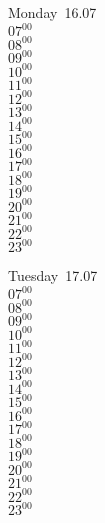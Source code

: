 \documentclass[11pt, a4paper]{book}\usepackage[]{graphicx}\usepackage[]{color}
\begin{document}
\begin{headerbox}
\end{headerbox}
\begin{weekdaybox}
  Monday~16.07\\
  { 
  \vfill
  $07^{00}$\\
$08^{00}$\\
$09^{00}$\\
$10^{00}$\\
$11^{00}$\\
$12^{00}$\\
$13^{00}$\\
$14^{00}$\\
$15^{00}$\\
$16^{00}$\\
$17^{00}$\\
$18^{00}$\\
$19^{00}$\\
$20^{00}$\\
$21^{00}$\\
$22^{00}$\\
$23^{00}$\\
  }
\end{weekdaybox}
\begin{weekdaybox}
  Tuesday~17.07\\
  { 
  \vfill
  $07^{00}$\\
$08^{00}$\\
$09^{00}$\\
$10^{00}$\\
$11^{00}$\\
$12^{00}$\\
$13^{00}$\\
$14^{00}$\\
$15^{00}$\\
$16^{00}$\\
$17^{00}$\\
$18^{00}$\\
$19^{00}$\\
$20^{00}$\\
$21^{00}$\\
$22^{00}$\\
$23^{00}$\\
  }
\end{weekdaybox}
\end{document}
